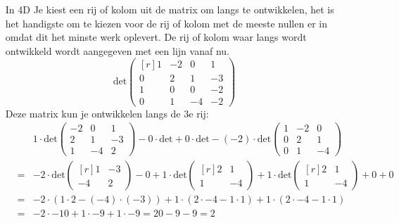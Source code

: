 \begin{enumerate}
	\item[In 4D] Je kiest een rij of kolom uit de matrix om langs te ontwikkelen, het is het handigste om te kiezen voor de rij of kolom met de meeste nullen er in omdat dit het minste werk oplevert. De rij of kolom waar langs wordt ontwikkeld wordt aangegeven met een lijn vanaf nu.
	\[ \mbox{det} \begin{pmatrix*}[r]
		1 & -2 & 0 & 1 \\
		0 & 2 & 1 & -3 \\
		1 & 0 & 0 & -2 \\
		0 & 1 & -4 & -2
	\end{pmatrix*}\]
	Deze matrix kun je ontwikkelen langs de 3e rij:
	\begin{eqnarray*}
		&&1 \cdot \mbox{det} \left(\!\begin{array}{rrr}
			-2 & 0 & 1 \\ \hline
			2 & 1 & -3 \\
			1 & -4 & 2
		\end{array}\!\right) - 0 \cdot \mbox{det} + 0 \cdot \mbox{det} - (-2) \cdot \mbox{det} \left(\!\begin{array}{r|rr}
			1 & -2 & 0 \\
			0 & 2 & 1 \\
			0 & 1 & -4
		\end{array}\!\right) \\
		&=& -2 \cdot \mbox{det} \begin{pmatrix*}[r] 1 & -3 \\ -4 & 2 \end{pmatrix*} - 0 + 1 \cdot \mbox{det} \begin{pmatrix*}[r] 2 & 1 \\ 1 & -4 \end{pmatrix*} + 1 \cdot \mbox{det} \begin{pmatrix*}[r] 2 & 1 \\ 1 & -4 \end{pmatrix*} + 0 + 0 \\
		&=& -2 \cdot (1 \cdot 2 - (-4) \cdot (-3)) + 1 \cdot (2 \cdot -4 - 1 \cdot 1) + 1 \cdot (2 \cdot -4 - 1 \cdot 1) \\
		&=& -2 \cdot -10 + 1 \cdot -9 + 1 \cdot -9 = 20 - 9 - 9 = 2
	\end{eqnarray*}
\end{enumerate}

